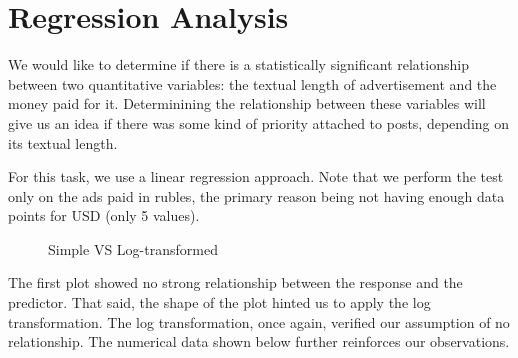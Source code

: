 \documentclass[12pt]{article}
\theoremstyle{definition}
\begin{document}
\section*{\centering Regression Analysis}

We would like to determine if there is a statistically significant relationship
between two quantitative variables: the textual length of advertisement and the
money paid for it. Determinining the relationship between these variables will
give us an idea if there was some kind of priority attached to posts, depending
on its textual length.

\bigskip

For this task, we use a linear regression approach. Note that we perform the
test only on the ads paid in rubles, the primary reason being not having enough
data points for USD (only 5 values).

\begin{figure}[H]
  \centering
  \hfill
  \caption*{Simple VS Log-transformed}
  \label{fig:example}
\end{figure}

\bigskip

The first plot showed no strong relationship between the response and the
predictor. That said, the shape of the plot hinted us to apply the log
transformation. The log transformation, once again, verified our assumption
of no relationship. The numerical data shown below further reinforces our
observations.
\end{document}
